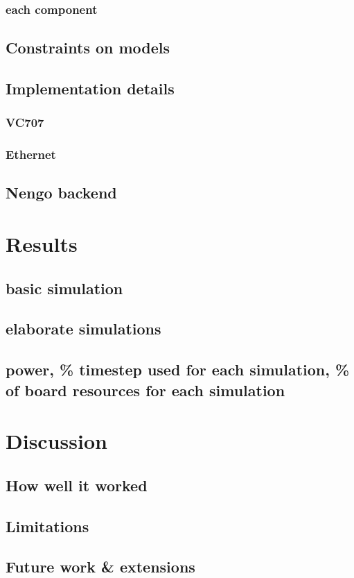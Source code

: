 \documentclass[english]{article}
\begin{document}
\subsubsection{each component}

\subsection{Constraints on models}

\subsection{Implementation details}

\subsubsection{VC707}

\subsubsection{Ethernet}

\subsection{Nengo backend}


\section{Results}

\subsection{basic simulation}

\subsection{elaborate simulations}


\subsection{power, \% timestep used for each simulation, \% of board resources for each simulation}

\section{Discussion}

\subsection{How well it worked}

\subsection{Limitations}
\subsection{Future work \& extensions}
\end{document}
